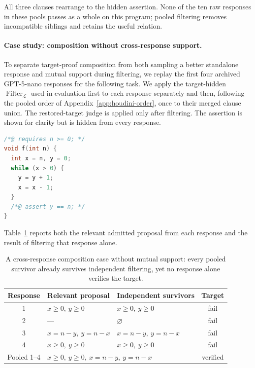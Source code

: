 All three clauses rearrange to the hidden assertion.  None of the ten raw
responses in these pools passes as a whole on this program; pooled filtering
removes incompatible siblings and retains the useful relation.

\paragraph{Case study: composition without cross-response support.}
To separate target-proof composition from both sampling a better standalone
response and mutual support during filtering, we replay the first four
archived GPT-5-nano responses for the following task.  We apply the
target-hidden \(\operatorname{Filter}_{\mathcal L}\) used in evaluation first
to each response separately and then, following the pooled order of
Appendix~\ref{app:houdini-order}, once to their merged clause union.  The
restored-target judge is applied only after filtering.  The assertion is shown
for clarity but is hidden from every response.

\begin{lstlisting}[language=C]
/*@ requires n >= 0; */
void f(int n) {
  int x = n, y = 0;
  while (x > 0) {
    y = y + 1;
    x = x - 1;
  }
  /*@ assert y == n; */
}
\end{lstlisting}

Table~\ref{tab:no-support-composition-case} reports both the relevant admitted
proposal from each response and the result of filtering that response alone.

\begin{table}[H]
\centering
\small
\setlength{\tabcolsep}{4pt}
\begin{tabular}{cllc}
\toprule
\rowcolor{algobg}
Response & Relevant proposal & Independent survivors & Target \\
\midrule
1 & \(x\geq0,\ y\geq0\) & \(x\geq0,\ y\geq0\) & fail \\
2 & --- & \(\varnothing\) & fail \\
3 & \(x=n-y,\ y=n-x\) & \(x=n-y,\ y=n-x\) & fail \\
4 & \(x\geq0,\ y\geq0\) & \(x\geq0,\ y\geq0\) & fail \\
\midrule
Pooled 1--4 & \multicolumn{2}{l}{\(x\geq0,\ y\geq0,\ x=n-y,\ y=n-x\)} & verified \\
\bottomrule
\end{tabular}
\caption{A cross-response composition case without mutual support: every
pooled survivor already survives independent filtering, yet no response alone
verifies the target.}
\label{tab:no-support-composition-case}
\end{table}


